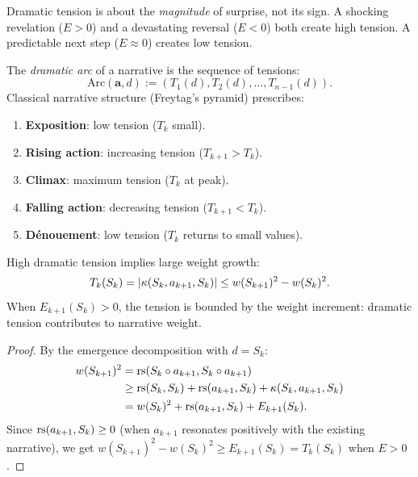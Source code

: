 \begin{remark}
Dramatic tension is about the \emph{magnitude} of surprise, not its sign.
A shocking revelation ($E > 0$) and a devastating reversal ($E < 0$) both
create high tension.  A predictable next step ($E \approx 0$) creates low
tension.
\end{remark}

\begin{definition}
\label{def:dramatic-arc}
The \emph{dramatic arc} of a narrative is the sequence of tensions:
\[
  \text{Arc}(\mathbf{a}, d) := (T_1(d), T_2(d), \ldots, T_{n-1}(d)).
\]
Classical narrative structure (Freytag's pyramid) prescribes:
\begin{enumerate}
  \item \textbf{Exposition}: low tension ($T_k$ small).
  \item \textbf{Rising action}: increasing tension ($T_{k+1} > T_k$).
  \item \textbf{Climax}: maximum tension ($T_k$ at peak).
  \item \textbf{Falling action}: decreasing tension ($T_{k+1} < T_k$).
  \item \textbf{Dénouement}: low tension ($T_k$ returns to small values).
\end{enumerate}
\end{definition}

\begin{theorem}
\label{thm:tension-weight}
High dramatic tension implies large weight growth:
\[
  T_k(S_k) = |\kappa(S_k, a_{k+1}, S_k)|
  \leq w(S_{k+1})^2 - w(S_k)^2.
\]
When $E_{k+1}(S_k) > 0$, the tension is bounded by the weight increment:
dramatic tension contributes to narrative weight.
\end{theorem}

\begin{proof}
By the emergence decomposition with $d = S_k$:
\begin{align*}
  w(S_{k+1})^2 &= \mathrm{rs}(S_k \circ a_{k+1}, S_k \circ a_{k+1}) \\
  &\geq \mathrm{rs}(S_k, S_k) + \mathrm{rs}(a_{k+1}, S_k) + \kappa(S_k, a_{k+1}, S_k) \\
  &= w(S_k)^2 + \mathrm{rs}(a_{k+1}, S_k) + E_{k+1}(S_k).
\end{align*}
Since $\mathrm{rs}(a_{k+1}, S_k) \geq 0$ (when $a_{k+1}$ resonates positively with
the existing narrative), we get
$w(S_{k+1})^2 - w(S_k)^2 \geq E_{k+1}(S_k) = T_k(S_k)$ when $E > 0$.
\end{proof}

